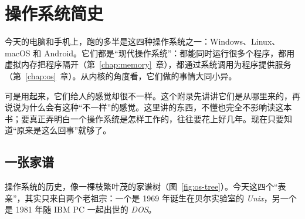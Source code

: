\chapter{操作系统简史}
\label{app:os-history}

今天的电脑和手机上，跑的多半是这四种操作系统之一：Windows、Linux、macOS 和 Android。它们都是“现代操作系统”：都能同时运行很多个程序，都用虚拟内存把程序隔开（第~\ref{chap:memory}~章），都通过系统调用为程序提供服务（第~\ref{chap:os}~章）。从内核的角度看，它们做的事情大同小异。

可是用起来，它们给人的感觉却很不一样。这个附录先讲讲它们是从哪里来的，再说说为什么会有这种“不一样”的感觉。这里讲的东西，不懂也完全不影响读这本书；要真正弄明白一个操作系统是怎样工作的，往往要花上好几年。现在只要知道“原来是这么回事”就够了。

\section{一张家谱}

操作系统的历史，像一棵枝繁叶茂的家谱树（图~\ref{fig:os-tree}）。今天这四个“表亲”，其实只来自两个老祖宗：一个是 1969 年诞生在贝尔实验室的 \emph{Unix}，另一个是 1981 年随 IBM PC 一起出世的 \emph{DOS}。

